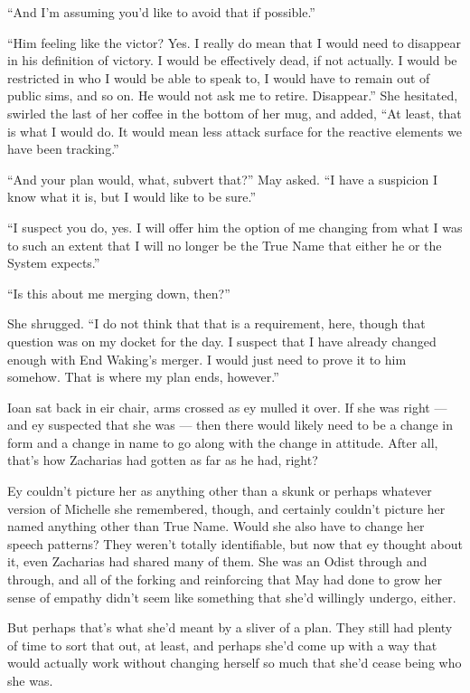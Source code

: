 ``And I'm assuming you'd like to avoid that if possible.''

``Him feeling like the victor? Yes. I really do mean that I would need to disappear in his definition of victory. I would be effectively dead, if not actually. I would be restricted in who I would be able to speak to, I would have to remain out of public sims, and so on. He would not ask me to retire. Disappear.'' She hesitated, swirled the last of her coffee in the bottom of her mug, and added, ``At least, that is what I would do. It would mean less attack surface for the reactive elements we have been tracking.''

``And your plan would, what, subvert that?'' May asked. ``I have a suspicion I know what it is, but I would like to be sure.''

``I suspect you do, yes. I will offer him the option of me changing from what I was to such an extent that I will no longer be the True Name that either he or the System expects.''

``Is this about me merging down, then?''

She shrugged. ``I do not think that that is a requirement, here, though that question was on my docket for the day. I suspect that I have already changed enough with End Waking's merger. I would just need to prove it to him somehow. That is where my plan ends, however.''

Ioan sat back in eir chair, arms crossed as ey mulled it over. If she was right — and ey suspected that she was — then there would likely need to be a change in form and a change in name to go along with the change in attitude. After all, that's how Zacharias had gotten as far as he had, right?

Ey couldn't picture her as anything other than a skunk or perhaps whatever version of Michelle she remembered, though, and certainly couldn't picture her named anything other than True Name. Would she also have to change her speech patterns? They weren't totally identifiable, but now that ey thought about it, even Zacharias had shared many of them. She was an Odist through and through, and all of the forking and reinforcing that May had done to grow her sense of empathy didn't seem like something that she'd willingly undergo, either.

But perhaps that's what she'd meant by a sliver of a plan. They still had plenty of time to sort that out, at least, and perhaps she'd come up with a way that would actually work without changing herself so much that she'd cease being who she was.

